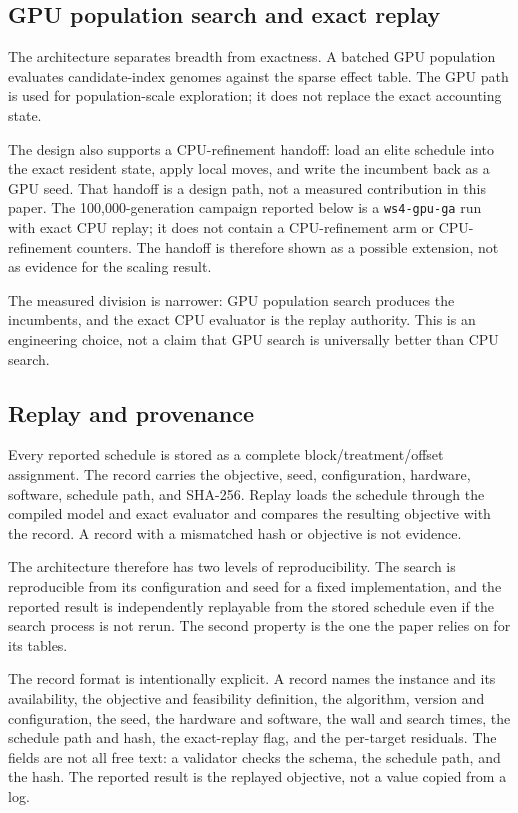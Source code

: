 \documentclass[11pt]{article}
\begin{document}
\subsection{GPU population search and exact replay}\label{gpu-population-search-and-cpu-refinement}

The architecture separates breadth from exactness. A batched GPU population evaluates candidate-index genomes against the sparse effect table. The GPU path is used for population-scale exploration; it does not replace the exact accounting state.

The design also supports a CPU-refinement handoff: load an elite schedule into the exact resident state, apply local moves, and write the incumbent back as a GPU seed. That handoff is a design path, not a measured contribution in this paper. The 100,000-generation campaign reported below is a \texttt{ws4-gpu-ga} run with exact CPU replay; it does not contain a CPU-refinement arm or CPU-refinement counters. The handoff is therefore shown as a possible extension, not as evidence for the scaling result.

The measured division is narrower: GPU population search produces the incumbents, and the exact CPU evaluator is the replay authority. This is an engineering choice, not a claim that GPU search is universally better than CPU search.

\subsection{Replay and provenance}\label{replay-and-provenance}

Every reported schedule is stored as a complete block/treatment/offset assignment. The record carries the objective, seed, configuration, hardware, software, schedule path, and SHA-256. Replay loads the schedule through the compiled model and exact evaluator and compares the resulting objective with the record. A record with a mismatched hash or objective is not evidence.

The architecture therefore has two levels of reproducibility. The search is reproducible from its configuration and seed for a fixed implementation, and the reported result is independently replayable from the stored schedule even if the search process is not rerun. The second property is the one the paper relies on for its tables.

The record format is intentionally explicit. A record names the instance and its availability, the
objective and feasibility definition, the algorithm, version and configuration, the seed, the hardware
and software, the wall and search times, the schedule path and hash, the exact-replay flag, and the
per-target residuals. The fields are not all free text: a validator checks the schema, the schedule
path, and the hash. The reported result is the replayed objective, not a value copied from a log.
\end{document}
